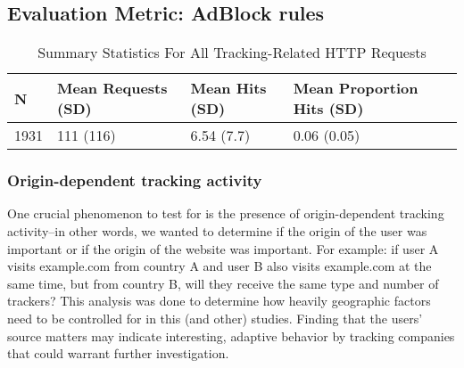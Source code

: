 \documentclass[conference]{IEEEtran}
\newcommand{\todo}[1]{}
\renewcommand{\todo}[1]{{\color{red} TODO: {#1}}}
\begin{document}
\subsection{Evaluation Metric: AdBlock rules}


\begin{table*}[t]
\centering
\caption{Summary Statistics For All Tracking-Related HTTP Requests}
\label{summaryTracking}
\begin{tabular}{|l|l|l|l|}
\hline
\textbf{N} & \textbf{Mean Requests (SD)} & \textbf{Mean Hits (SD)} & \textbf{Mean Proportion Hits (SD)} \\ \hline
1931       & 111 (116)                   & 6.54 (7.7)              & 0.06 (0.05)                        \\ \hline
\end{tabular}
\end{table*}


\subsubsection{Origin-dependent tracking activity}

One crucial phenomenon to test for is the presence of origin-dependent tracking activity--in other words, we wanted to determine if the origin of the user was important or if the origin of the website was important. For example: if user A visits example.com from country A and user B also visits example.com at the same time, but from country B, will they receive the same type and number of trackers?  This analysis was done to determine how heavily geographic factors need to be controlled for in this (and other) studies. Finding that the users' source matters may indicate interesting, adaptive behavior by tracking companies that could warrant further investigation.

\end{document}
